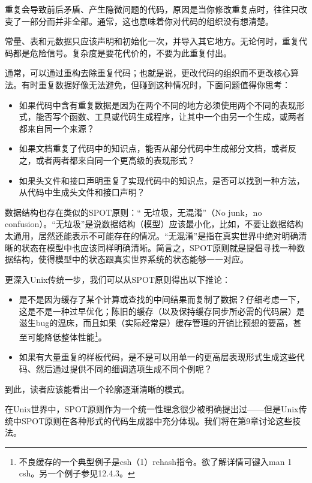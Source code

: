 \documentclass[12pt,oneside]{book}
\begin{document}
重复会导致前后矛盾、产生隐微问题的代码，原因是当你修改重复点时，往往只改变了一部分而并非全部。通常，这也意味着你对代码的组织没有想清楚。

常量、表和元数据只应该声明和初始化一次，并导入其它地方。无论何时，重复代码都是危险信号。复杂度是要花代价的，不要为此重复付出。

通常，可以通过重构去除重复代码；也就是说，更改代码的组织而不更改核心算法。有时重复数据好像无法避免，但碰到这种情况时，下面问题值得你思考：

\begin{itemize}
\item 如果代码中含有重复数据是因为在两个不同的地方必须使用两个不同的表现形式，能否写个函数、工具或代码生成程序，让其中一个由另一个生成，或两者都来自同一个来源？
\item 如果文档重复了代码中的知识点，能否从部分代码中生成部分文档，或者反之，或者两者都来自同一个更高级的表现形式？
\item 如果头文件和接口声明重复了实现代码中的知识点，是否可以找到一种方法，从代码中生成头文件和接口声明？
\end{itemize}

数据结构也存在类似的SPOT原则：“ 无垃圾，无混淆”（No junk，no confusion）。“无垃圾”是说数据结构（模型）应该最小化，比如，不要让数据结构太通用，居然还能表示不可能存在的情况。“无混淆”是指在真实世界中绝对明确清晰的状态在模型中也应该同样明确清晰。简言之，SPOT原则就是提倡寻找一种数据结构，使得模型中的状态跟真实世界系统的状态能够一一对应。

更深入Unix传统一步，我们可以从SPOT原则得出以下推论：

\begin{itemize}
\item 是不是因为缓存了某个计算或查找的中间结果而复制了数据？仔细考虑一下，这是不是一种过早优化；陈旧的缓存（以及保持缓存同步所必需的代码层）是滋生bug的温床，而且如果（实际经常是）缓存管理的开销比预想的要高，甚至可能降低整体性能\footnote{不良缓存的一个典型例子是csh（1）rehash指令。欲了解详情可键入man 1 csh。另一个例子参见12.4.3。}。
\item 如果有大量重复的样板代码，是不是可以用单一的更高层表现形式生成这些代码、然后通过提供不同的细调选项生成不同个例呢？
\end{itemize}

到此，读者应该能看出一个轮廓逐渐清晰的模式。

在Unix世界中，SPOT原则作为一个统一性理念很少被明确提出过——但是Unix传统中SPOT原则在各种形式的代码生成器中充分体现。我们将在第9章讨论这些技法。
\end{document}
